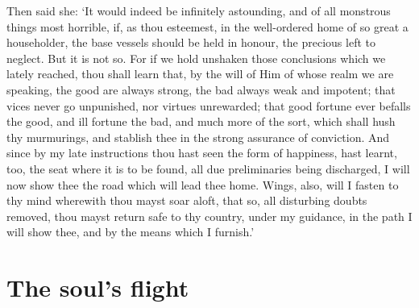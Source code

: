 \documentclass[12pt]{book}
\begin{document}
Then said she: `It would indeed be infinitely astounding, and of all
monstrous things most horrible, if, as thou esteemest, in the
well-ordered home of so great a householder, the base vessels should be
held in honour, the precious left to neglect. But it is not so. For if
we hold unshaken those conclusions which we lately reached, thou shall
learn that, by the will of Him of whose realm we are speaking, the good
are always strong, the bad always weak and impotent; that vices never go
unpunished, nor virtues unrewarded; that good fortune ever befalls the
good, and ill fortune the bad, and much more of the sort, which shall
hush thy murmurings, and stablish thee in the strong assurance of
conviction. And since by my late instructions thou hast seen the form of
happiness, hast learnt, too, the seat where it is to be found, all due
preliminaries being discharged, I will now show thee the road which will
lead thee home. Wings, also, will I fasten to thy mind wherewith thou
mayst soar aloft, that so, all disturbing doubts removed, thou mayst
return safe to thy country, under my guidance, in the path I will show
thee, and by the means which I furnish.'



\section{The soul's flight}
\end{document}
